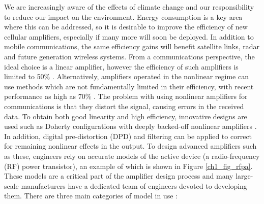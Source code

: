 \documentclass[../thesis/thesis.tex]{subfiles}
\begin{document}
We are increasingly aware of the effects of climate change and our responsibility to reduce our impact on the environment. Energy consumption is a key area where this can be addressed, so it is desirable to improve the efficiency of new cellular amplifiers, especially if many more will soon be deployed. In addition to mobile communications, the same efficiency gains will benefit satellite links, radar and future generation wireless systems. From a communications perspective, the ideal choice is a linear amplifier, however the efficiency of such amplifiers is limited to 50\% \cite{Cripps_2006}. Alternatively, amplifiers operated in the nonlinear regime can use methods which are not fundamentally limited in their efficiency, with recent performance as high as 70\% \cite{Kosaka_2016,Bhardwaj_2019}. The problem with using nonlinear amplifiers for communications is that they distort the signal, causing errors in the received data. To obtain both good linearity and high efficiency, innovative designs are used such as Doherty configurations with deeply backed-off nonlinear amplifiers \cite{Camarchia_2015}. In addition, digital pre-distortion (DPD) and filtering can be applied to correct for remaining nonlinear effects in the output. To design advanced amplifiers such as these, engineers rely on accurate models of the active device (a radio-frequency (RF) power transistor), an example of which is shown in Figure \ref{ch1_fig_rfpa}. These models are a critical part of the amplifier design process and many large-scale manufacturers have a dedicated team of engineers devoted to developing them. There are three main categories of model in use \cite{Aaen_2007}:
\end{document}
